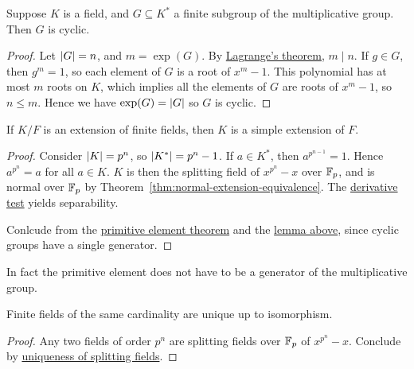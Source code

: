 \begin{lemma}\label{lem:finite-mult-group-cyclic}
    Suppose \(K\) is a field,
    and \(G \subseteq K^\ast\) a finite subgroup of the multiplicative group.
    Then \(G\) is cyclic.
\end{lemma}
\begin{proof}
    Let \(\abs{G} = n\), and \(m = \exp(G)\).
    By \hyperref[cor:order-element-group]{Lagrange's theorem}, \(m \mid n\).
    If \(g \in G\), then \(g^m = 1\), so each element of \(G\) is a root of \(x^m - 1\).
    This polynomial has at most \(m\) roots on \(K\),
    which implies all the elements of \(G\) are roots of \(x^m - 1\), so \(n \leq m\).
    Hence we have \(\exp(G) = \abs{G}\) so \(G\) is cyclic.
\end{proof}
\begin{corollary}
    If \(K/F\) is an extension of finite fields,
    then \(K\) is a simple extension of \(F\).
\end{corollary}
\begin{proof}
    Consider \(\abs{K} = p^n\), so \(\abs{K^\ast} = p^n - 1\).
    If \(a \in K^\ast\), then \(a^{p^{n-1}} = 1\).
    Hence \(a^{p^n} = a\) for all \(a \in K\).
    \(K\) is then the splitting field of \(x^{p^n}-x\) over \(\mathbb{F}_p\),
    and is normal over \(\mathbb{F}_p\) by Theorem~\ref{thm:normal-extension-equivalence}.
    The \hyperref[prop:derivative-inseparability]{derivative test} yields separability.

    Conlcude from the \hyperref[thm:primitive-element]{primitive element theorem}
    and the \hyperref[lem:finite-mult-group-cyclic]{lemma above},
    since cyclic groups have a single generator.
\end{proof}
\begin{remark}
    In fact the primitive element
    does not have to be a generator of the multiplicative group.
\end{remark}
\begin{corollary}\label{cor:uniqueness-finite-field}
    Finite fields of the same cardinality are unique up to isomorphism.
\end{corollary}
\begin{proof}
    Any two fields of order \(p^n\) are splitting fields over \(\mathbb{F}_p\) of \(x^{p^n} - x\).
    Conclude by \hyperref[thm:uniqueness-splitting-field]{uniqueness of splitting fields}.
\end{proof}

